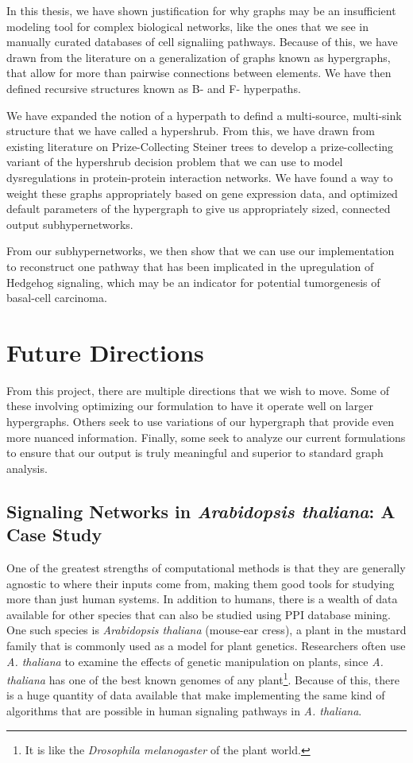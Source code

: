 \documentclass[12pt,twoside]{reedthesis}
\theoremstyle{definition}
\begin{document}
  In this thesis, we have shown justification for why graphs may be an insufficient modeling tool for complex biological networks, like the ones that we see in manually curated databases of cell signaliing pathways. Because of this, we have drawn from the literature on a generalization of graphs known as hypergraphs, that allow for more than pairwise connections between elements. We have then defined recursive structures known as B- and F- hyperpaths.\par

  We have expanded the notion of a hyperpath to defind a multi-source, multi-sink structure that we have called a hypershrub. From this, we have drawn from existing literature on Prize-Collecting Steiner trees to develop a prize-collecting variant of the hypershrub decision problem that we can use to model dysregulations in protein-protein interaction networks. We have found a way to weight these graphs appropriately based on gene expression data, and optimized default parameters of the hypergraph to give us appropriately sized, connected output subhypernetworks.\par

  From our subhypernetworks, we then show that we can use our implementation to reconstruct one pathway that has been implicated in the upregulation of Hedgehog signaling, which may be an indicator for potential tumorgenesis of basal-cell carcinoma.

  \section{Future Directions}

  From this project, there are multiple directions that we wish to move. Some of these involving optimizing our formulation to have it operate well on larger hypergraphs. Others seek to use variations of our hypergraph that provide even more nuanced information. Finally, some seek to analyze our current formulations to ensure that our output is truly meaningful and superior to standard graph analysis.

   \subsection{Signaling Networks in \emph{Arabidopsis thaliana}: A Case Study}

   One of the greatest strengths of computational methods is that they are generally agnostic to where their inputs come from, making them good tools for studying more than just human systems. In addition to humans, there is a wealth of data available for other species that can also be studied using PPI database mining. One such species is \textit{Arabidopsis thaliana} (mouse-ear cress), a plant in the mustard family that is commonly used as a model for plant genetics. Researchers often use \textit{A. thaliana} to examine the effects of genetic manipulation on plants, since \textit{A. thaliana} has one of the best known genomes of any plant\footnote{It is like the \textit{Drosophila melanogaster} of the plant world.}. Because of this, there is a huge quantity of data available that make implementing the same kind of algorithms that are possible in human signaling pathways in \textit{A. thaliana}.
\end{document}
